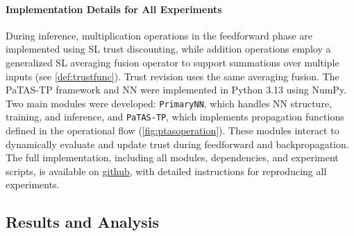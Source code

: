 \DIFaddend \paragraph*{Implementation Details for All Experiments}
During inference, multiplication operations in the feedforward phase are implemented using SL trust discounting, while addition operations employ a generalized SL averaging fusion operator to support summations over multiple inputs (see \cref{def:trustfunc}). Trust revision uses the same averaging fusion. The \ac{PaTAS-TP} framework and \ac{NN} were implemented in Python 3.13 using NumPy. Two main modules were developed: \texttt{PrimaryNN}, which handles \ac{NN} structure, training, and inference, and \texttt{PaTAS-TP}, which implements  propagation functions defined in the operational flow (\cref{fig:ptasoperation}). These modules interact to dynamically evaluate and update trust during feedforward and backpropagation. The \DIFaddbegin {}\DIFaddend full implementation, including all modules, dependencies, and experiment scripts, is available on \href{https://github.com/Ouatt-Isma/PaTAS-Subjective-Logic-Neural-Networks-Trust-Assessment}{github}, with detailed instructions for reproducing all experiments.

\subsection{Results and Analysis}

